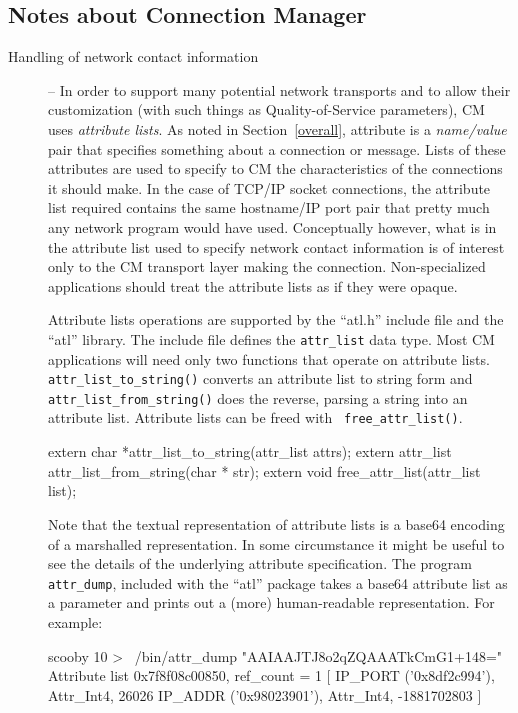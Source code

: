 \documentclass[11pt]{article}
\begin{document}
\subsection{Notes about Connection Manager}
\begin{description}
\item[Handling of network contact information] -- In order to support many
  potential network transports and to allow 
their customization (with such things as Quality-of-Service parameters), CM
uses {\em attribute lists}.  As noted in Section~\ref{overall}, attribute is
a {\it name/value} pair that specifies something about a connection or
message.   Lists of these attributes are used to specify to CM the
characteristics of the connections it should make.  In the case of TCP/IP
socket connections, the attribute list required contains the same
hostname/IP port pair that pretty much any network program would have used.  Conceptually
however, what is in the attribute list used to specify network contact
information is of interest only to the CM transport layer making the
connection.  Non-specialized applications should treat the attribute lists
as if they were opaque.  

Attribute lists operations are supported by the ``atl.h'' include file and
the ``atl'' library.  The include file defines the {\tt attr\_list} data
type.  Most CM applications will need only two functions that operate on
attribute lists.  {\tt attr\_list\_to\_string()} converts an attribute list
to string form and {\tt attr\_list\_from\_string()} does the reverse, parsing
a string into an attribute list.  Attribute lists can be freed with {\tt
free\_attr\_list()}.
\begin{verbatimtab}
	extern char *attr_list_to_string(attr_list attrs);
	extern attr_list attr_list_from_string(char * str);
	extern void free_attr_list(attr_list list);
\end{verbatimtab}

Note that the textual representation of attribute lists is a base64 encoding
of a marshalled representation.  In some circumstance it might be useful to
see the details of the underlying attribute specification.  The program {\tt
  attr\_dump}, included with the ``atl'' package takes a base64 attribute
list as a parameter and prints out a (more) human-readable representation.
For example:
\begin{verbatimtab} 
scooby 10 > ~/bin/attr_dump "AAIAAJTJ8o2qZQAAATkCmG1+148="
Attribute list 0x7f8f08c00850, ref_count = 1
[
   { IP_PORT ('0x8df2c994'), Attr_Int4, 26026 }
   { IP_ADDR ('0x98023901'), Attr_Int4, -1881702803 }
]
\end{verbatimtab}


\end{description}
\end{document}
